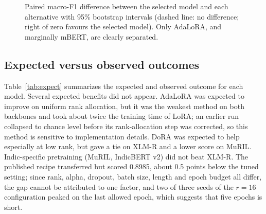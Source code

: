 \documentclass[conference]{IEEEtran}
\begin{document}
\begin{figure}[t]
\centering
{}
\caption{Paired macro-F1 difference between the selected model and each alternative with 95\% bootstrap intervals (dashed line: no difference; right of zero favours the selected model). Only AdaLoRA, and marginally mBERT, are clearly separated.}
\label{fig:forest}
\end{figure}

\subsection{Expected versus observed outcomes}
Table~\ref{tab:expect} summarizes the expected and observed outcome for each model. Several expected benefits did not appear. AdaLoRA was expected to improve on uniform rank allocation, but it was the weakest method on both backbones and took about twice the training time of LoRA; an earlier run collapsed to chance level before its rank-allocation step was corrected, so this method is sensitive to implementation details. DoRA was expected to help especially at low rank, but gave a tie on XLM-R and a lower score on MuRIL. Indic-specific pretraining (MuRIL, IndicBERT v2) did not beat XLM-R. The published recipe transferred but scored 0.8985, about 0.5 points below the tuned setting; since rank, alpha, dropout, batch size, length and epoch budget all differ, the gap cannot be attributed to one factor, and two of three seeds of the $r=16$ configuration peaked on the last allowed epoch, which suggests that five epochs is short.
\end{document}
